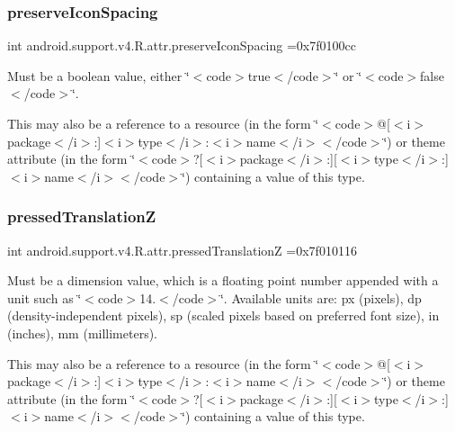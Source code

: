 \subsubsection{\texorpdfstring{preserve\+Icon\+Spacing}{preserveIconSpacing}}
{\footnotesize\ttfamily int android.\+support.\+v4.\+R.\+attr.\+preserve\+Icon\+Spacing =0x7f0100cc\hspace{0.3cm}{\ttfamily [static]}}

Must be a boolean value, either \char`\"{}$<$code$>$true$<$/code$>$\char`\"{} or \char`\"{}$<$code$>$false$<$/code$>$\char`\"{}. 

This may also be a reference to a resource (in the form \char`\"{}$<$code$>$@\mbox{[}$<$i$>$package$<$/i$>$\+:\mbox{]}$<$i$>$type$<$/i$>$\+:$<$i$>$name$<$/i$>$$<$/code$>$\char`\"{}) or theme attribute (in the form \char`\"{}$<$code$>$?\mbox{[}$<$i$>$package$<$/i$>$\+:\mbox{]}\mbox{[}$<$i$>$type$<$/i$>$\+:\mbox{]}$<$i$>$name$<$/i$>$$<$/code$>$\char`\"{}) containing a value of this type. \mbox{\label{classandroid_1_1support_1_1v4_1_1R_1_1attr_ab422cdde74a71733904ec36f3451d234}} 
\subsubsection{\texorpdfstring{pressed\+TranslationZ}{pressedTranslationZ}}
{\footnotesize\ttfamily int android.\+support.\+v4.\+R.\+attr.\+pressed\+TranslationZ =0x7f010116\hspace{0.3cm}{\ttfamily [static]}}

Must be a dimension value, which is a floating point number appended with a unit such as \char`\"{}$<$code$>$14.\+5sp$<$/code$>$\char`\"{}. Available units are\+: px (pixels), dp (density-\/independent pixels), sp (scaled pixels based on preferred font size), in (inches), mm (millimeters). 

This may also be a reference to a resource (in the form \char`\"{}$<$code$>$@\mbox{[}$<$i$>$package$<$/i$>$\+:\mbox{]}$<$i$>$type$<$/i$>$\+:$<$i$>$name$<$/i$>$$<$/code$>$\char`\"{}) or theme attribute (in the form \char`\"{}$<$code$>$?\mbox{[}$<$i$>$package$<$/i$>$\+:\mbox{]}\mbox{[}$<$i$>$type$<$/i$>$\+:\mbox{]}$<$i$>$name$<$/i$>$$<$/code$>$\char`\"{}) containing a value of this type. \mbox{\label{classandroid_1_1support_1_1v4_1_1R_1_1attr_a2f33b6b0b1c10888283153513a2d5f7b}} 
